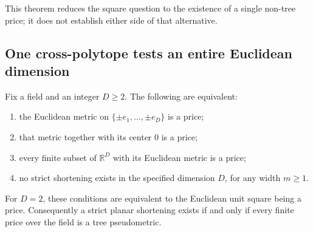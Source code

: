 This theorem reduces the square question to the existence of a single
non-tree price; it does not establish either side of that alternative.

\subsection{One cross-polytope tests an entire Euclidean dimension}

\begin{theorem}
\label{pg:crosspoly-gate}
Fix a field and an integer $D\geq2$. The following are equivalent:
\begin{enumerate}
\item the Euclidean metric on $\{\pm e_1,\ldots,\pm e_D\}$ is a price;
\item that metric together with its center $0$ is a price;
\item every finite subset of $\mathbb R^D$ with its Euclidean metric is a price;
\item no strict shortening exists in the specified dimension $D$, for any
width $m\geq1$.
\end{enumerate}
For $D=2$, these conditions are equivalent to the Euclidean unit square
being a price. Consequently a strict planar shortening exists if and only
if every finite price over the field is a tree pseudometric.
\end{theorem}
